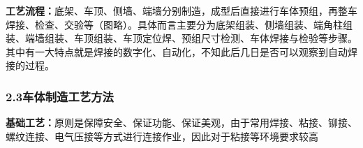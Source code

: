 \documentclass[12pt, oneside, a4paper]{ctexart}
\begin{document}
{\bf{}工艺流程：}底架、车顶、侧墙、端墙分别制造，成型后直接进行车体预组，再整车焊接、检查、交验等（图略）。具体而言主要分为底架组装、侧墙组装、端角柱组装、端墙组装、车顶组装、车顶定位焊、预组尺寸检测、车体焊接与检验等步骤。其中有一大特点就是焊接的数字化、自动化，不知此后几日是否可以观察到自动焊接的过程。\par{}
\vspace{-5mm}\subsubsection*{2.3\quad{}车体制造工艺方法}\vspace{-2mm}
{\bf{}基础工艺：}原则是保障安全、保证功能、保证美观，由于常用焊接、粘接、铆接、螺纹连接、电气压接等方式进行连接作业，因此对于粘接等环境要求较高\par{}
\end{document}
